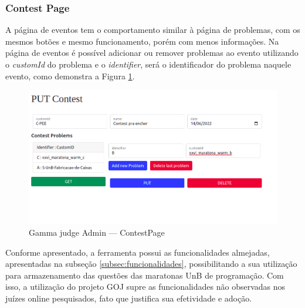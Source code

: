 \subsubsection{Contest Page}

A página de eventos tem o comportamento similar à página de problemas, com os mesmos botões e mesmo funcionamento, porém com menos informações. Na página de eventos é possível adicionar ou remover problemas ao evento utilizando o \textit{customId} do problema e o \textit{identifier}, será o identificador do problema naquele evento, como demonstra a Figura \ref{fig:judge_admin_contest}.

\begin{figure}[H]
    \centering
    \includegraphics[keepaspectratio=true,scale=0.45]{figuras/contest_page.png}
    \caption{Gamma judge Admin — ContestPage}
    \label{fig:judge_admin_contest}
\end{figure}
Conforme apresentado, a ferramenta possui as funcionalidades almejadas, apresentadas na subseção \ref{subsec:funcionalidades}, possibilitando a sua utilização para armazenamento das questões das maratonas UnB de programação. Com isso, a utilização do projeto GOJ supre as funcionalidades não observadas nos juízes online pesquisados, fato que justifica sua efetividade e adoção.
